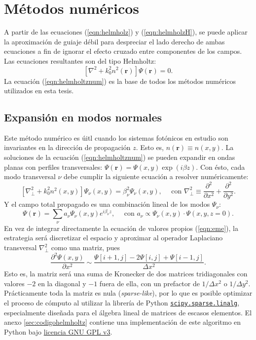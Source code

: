 \chapter{Métodos numéricos}
A partir de las ecuaciones (\ref{eqn:helmholz}) y (\ref{eqn:helmholzH}), se puede aplicar la aproximación de guiaje débil para despreciar el lado derecho de ambas ecuaciones a fin de ignorar el efecto cruzado entre componentes de los campos. Las ecuaciones resultantes son del tipo Helmholtz:
\begin{equation}
	\left[\nabla^2 + k_0^2 n^2(\textbf{r})\right]\Psi(\textbf{r}) = 0. \label{eqn:helmholtznum}
\end{equation}
La ecuación (\ref{eqn:helmholtznum}) es la base de todos los métodos numéricos utilizados en esta tesis.
\section{Expansión en modos normales}
Este método numérico es úitl cuando los sistemas fotónicos en estudio son invariantes en la dirección de propagación $z$. Esto es, $n(\textbf{r})\equiv n(x,y)$. La soluciones de la ecuación (\ref{eqn:helmholtznum}) se pueden expandir en ondas planas con perfiles transversales: $\Psi(\textbf{r}) = \Psi(x,y) \exp({i\beta z})$. Con ésto, cada modo transversal $\nu$ debe cumplir la siguiente ecuación a resolver numéricamente:
\begin{equation}
	\left[\nabla_\perp^2 + k_0^2 n^2(x,y)\right]\Psi_\nu(x,y) = \beta_\nu^2\Psi_\nu(x,y) , \quad\text{ con } \nabla_\perp^2 \equiv \frac{\partial^2}{\partial x^2} + \frac{\partial^2}{\partial y^2}.
	\label{eqn:eme}
\end{equation}
Y el campo total propagado es una combinación lineal de los modos $\Psi_\nu$: 
\begin{equation}
	\Psi(\textbf{r}) = \sum_\nu a_\nu \Psi_\nu(x,y) e^{i\beta_\nu z}, \quad\text{ con } a_\nu \propto \Psi_\nu(x,y) \cdot \Psi(x, y, z=0).
\end{equation}
En vez de integrar directamente la ecuación de valores propios (\ref{eqn:eme}), la estrategia será discretizar el espacio y aproximar al operador Laplaciano transversal $\nabla_\perp^2$ como una matriz, pues $$\frac{\partial^2 \Psi(x,y)}{\partial x^2} \sim \frac{\Psi[i+1,j]-2\Psi[i,j]+\Psi[i-1,j]}{\Delta x ^2}.
$$
Esto es, la matriz será una suma de Kronecker de dos matrices tridiagonales con valores $-2$ en la diagonal y $-1$ fuera de ella, con un prefactor de $1/\Delta x^2$ o $1/\Delta y^2$.
Prácticamente toda la matriz es nula (\textit{sparse-like}), por lo que es posible optimizar el proceso de cómputo al utilizar la librería de Python \href{https://docs.scipy.org/doc/scipy/reference/sparse.linalg.html}{\color{magenta}\texttt{scipy.sparse.linalg}}, especialmente diseñada para el álgebra lineal de matrices de escasos elementos. El anexo \ref{sec:codigohelmholtz} contiene una implementación de este algoritmo en Python bajo \href{https://www.gnu.org/licenses/gpl-3.0.html}{\color{magenta}licencia GNU GPL v3}.
